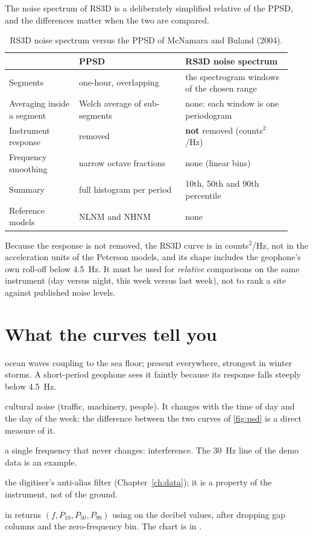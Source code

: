 The noise spectrum of RS3D is a deliberately simplified relative of the PPSD, and the differences matter when the
two are compared.

\begin{table}[tbp]
\centering\small
\caption{RS3D noise spectrum versus the PPSD of McNamara and Buland (2004).}\label{tab:ppsd}
\begin{tabular}{@{}L{0.23\linewidth}L{0.35\linewidth}L{0.35\linewidth}@{}}
\toprule
 & PPSD & RS3D noise spectrum\\ \midrule
Segments & one-hour, overlapping & the spectrogram windows of the chosen range\\
Averaging inside a segment & Welch average of sub-segments & none: each window is one periodogram\\
Instrument response & removed & \textbf{not} removed (counts$^2$/Hz)\\
Frequency smoothing & narrow octave fractions & none (linear bins)\\
Summary & full histogram per period & 10th, 50th and 90th percentile\\
Reference models & NLNM and NHNM & none\\
\bottomrule
\end{tabular}
\end{table}

\begin{rs3dwarn}
Because the response is not removed, the RS3D curve is in counts$^2$/Hz, not in the acceleration units of the
Peterson models, and its shape includes the geophone's own roll-off below 4.5~Hz. It must be used for
\emph{relative} comparisons on the same instrument (day versus night, this week versus last week), not to rank a site
against published noise levels.
\end{rs3dwarn}

\section{What the curves tell you}
\begin{description}[leftmargin=2.2cm,style=nextline]
\item[Microseism, 0.1--0.3~Hz] ocean waves coupling to the sea floor; present everywhere, strongest in winter storms. A
  short-period geophone sees it faintly because its response falls steeply below 4.5~Hz.
\item[Above 1~Hz] cultural noise (traffic, machinery, people). It changes with the time of day and the day of the week;
  the difference between the two curves of \cref{fig:psd} is a direct measure of it.
\item[Narrow peaks] a single frequency that never changes: interference. The 30~Hz line of the demo data is an example.
\item[Roll-off near 50~Hz] the digitiser's anti-alias filter (Chapter~\ref{ch:data}); it is a property of the instrument,
  not of the ground.
\end{description}

\begin{rs3dapp}
 in  returns $(f, P_{10}, P_{50}, P_{90})$ using
 on the decibel values, after dropping gap columns and the zero-frequency bin. The chart is
 in .
\end{rs3dapp}
